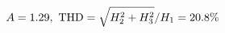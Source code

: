\documentclass[preview]{standalone}
\begin{document}
\begin{align*}
\special{dvisvgm:raw <g id='unique000'>}A=1.29,\ \text{THD}=\sqrt{H_2^2+H_3^2}/H_1=20.8\%\special{dvisvgm:raw </g>}
\end{align*}
\end{document}
